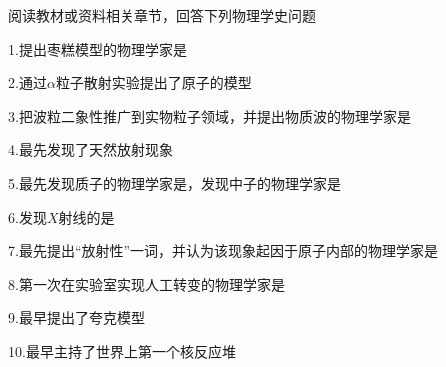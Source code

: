 	阅读教材或资料相关章节，回答下列物理学史问题

	1.提出枣糕模型的物理学家是\lunl{5em}

	2.\lunl{4em}通过\(\alpha\)粒子散射实验提出了原子的\lunl{5em}模型

	3.把波粒二象性推广到实物粒子领域，并提出物质波的物理学家是\lunl{5em}

	4.\lunl{5em}最先发现了天然放射现象

	5.最先发现质子的物理学家是\lunl{5em}，发现中子的物理学家是\lunl{5em}

	6.发现\(X\)射线的是\lunl{5em}

	7.最先提出“放射性”一词，并认为该现象起因于原子内部的物理学家是\lunl{5em}

	8.第一次在实验室实现人工转变的物理学家是\lunl{5em}

	9.\lunl{5em}最早提出了夸克模型

	10.\lunl{5em}最早主持了世界上第一个核反应堆